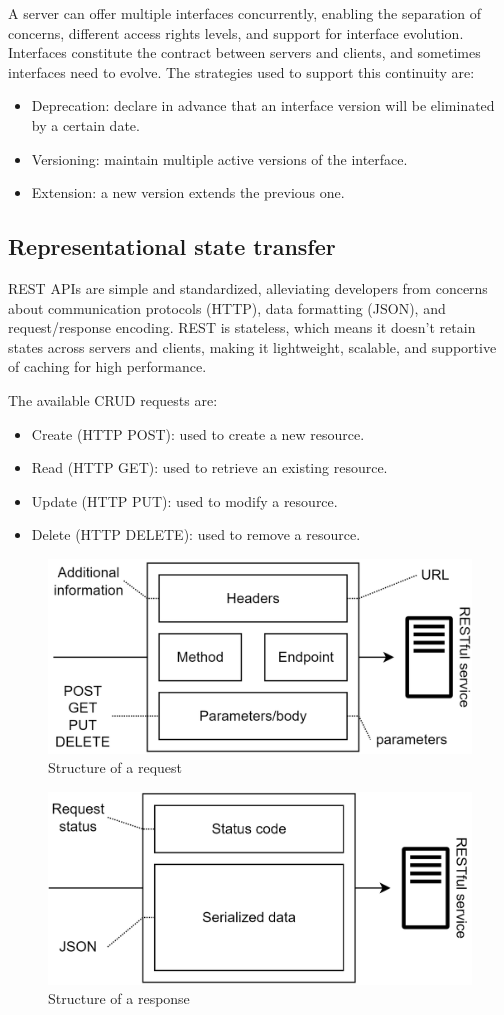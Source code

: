 A server can offer multiple interfaces concurrently, enabling the separation of concerns, different access rights levels, and support for interface evolution.
Interfaces constitute the contract between servers and clients, and sometimes interfaces need to evolve.
The strategies used to support this continuity are: 
\begin{itemize}
    \item Deprecation: declare in advance that an interface version will be eliminated by a certain date.
    \item Versioning: maintain multiple active versions of the interface.
    \item Extension: a new version extends the previous one. 
\end{itemize}

\subsection*{Representational state transfer}
REST APIs are simple and standardized, alleviating developers from concerns about communication protocols (HTTP), data formatting (JSON), and request/response encoding. 
REST is stateless, which means it doesn't retain states across servers and clients, making it lightweight, scalable, and supportive of caching for high performance.

The available CRUD requests are:
\begin{itemize}
    \item Create (HTTP POST): used to create a new resource.
    \item Read (HTTP GET): used to retrieve an existing resource.
    \item Update (HTTP PUT): used to modify a resource.
    \item Delete (HTTP DELETE): used to remove a resource.
\end{itemize}
\begin{figure}[H]
    \centering
    \includegraphics[width=0.6\linewidth]{images/rest.png}
    \caption{Structure of a request}
\end{figure}
\begin{figure}[H]
    \centering
    \includegraphics[width=0.6\linewidth]{images/rest1.png}
    \caption{Structure of a response}
\end{figure}

